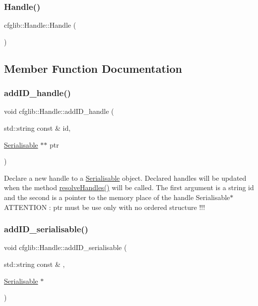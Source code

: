 \subsubsection{\texorpdfstring{Handle()}{Handle()}}
{\footnotesize\ttfamily cfglib\+::\+Handle\+::\+Handle (\begin{DoxyParamCaption}{ }\end{DoxyParamCaption})}



\subsection{Member Function Documentation}
\mbox{\label{classcfglib_1_1Handle_ab8a43d033b2fe3a68aecf4dbee61dba2}} 
\subsubsection{\texorpdfstring{add\+I\+D\+\_\+handle()}{addID\_handle()}}
{\footnotesize\ttfamily void cfglib\+::\+Handle\+::add\+I\+D\+\_\+handle (\begin{DoxyParamCaption}\item[{std\+::string const \&}]{id,  }\item[{\hyperlink{classcfglib_1_1Serialisable}{Serialisable} $\ast$$\ast$}]{ptr }\end{DoxyParamCaption})}

Declare a new handle to a \hyperlink{classcfglib_1_1Serialisable}{Serialisable} object. Declared handles will be updated when the method \hyperlink{classcfglib_1_1Handle_a8f524a2c4b97e7e3dda8aaa0d6dcd577}{resolve\+Handles()} will be called. The first argument is a string id and the second is a pointer to the memory place of the handle Serialisable$\ast$ A\+T\+T\+E\+N\+T\+I\+ON \+: ptr must be use only with no ordered structure !!! \mbox{\label{classcfglib_1_1Handle_ad50bcb573b09ca46cccd3ac988a653d0}} 
\subsubsection{\texorpdfstring{add\+I\+D\+\_\+serialisable()}{addID\_serialisable()}}
{\footnotesize\ttfamily void cfglib\+::\+Handle\+::add\+I\+D\+\_\+serialisable (\begin{DoxyParamCaption}\item[{std\+::string const \&}]{,  }\item[{\hyperlink{classcfglib_1_1Serialisable}{Serialisable} $\ast$}]{ }\end{DoxyParamCaption})}

